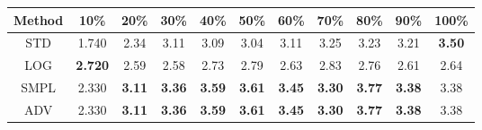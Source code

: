 \documentclass{standalone}
\begin{document}
\begin{tabular}{c|cccccccccc}
      \toprule
      Method & 10\% & 20\% & 30\% & 40\% & 50\% & 60\% & 70\% & 80\% & 90\% & 100\% \\
      \midrule
STD & 1.740 & 2.34 & 3.11 & 3.09 & 3.04 & 3.11 & 3.25 & 3.23 & 3.21 & \textbf{3.50}\\
LOG & \textbf{2.720} & 2.59 & 2.58 & 2.73 & 2.79 & 2.63 & 2.83 & 2.76 & 2.61 & 2.64\\
SMPL & 2.330 & \textbf{3.11} & \textbf{3.36} & \textbf{3.59} & \textbf{3.61} & \textbf{3.45} & \textbf{3.30} & \textbf{3.77} & \textbf{3.38} & 3.38\\
ADV & 2.330 & \textbf{3.11} & \textbf{3.36} & \textbf{3.59} & \textbf{3.61} & \textbf{3.45} & \textbf{3.30} & \textbf{3.77} & \textbf{3.38} & 3.38\\
  \bottomrule
\end{tabular}
\end{document}
